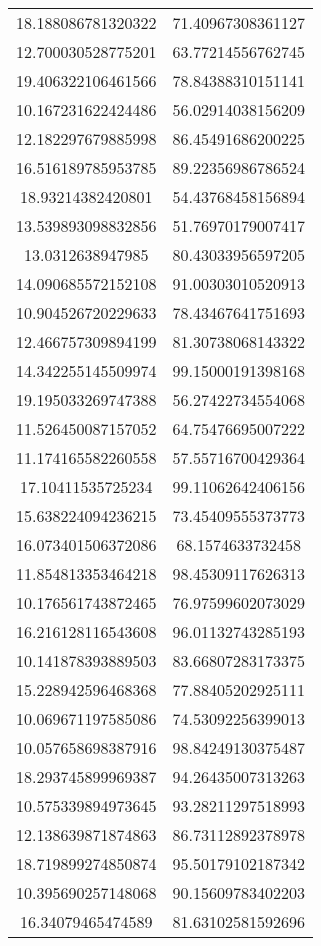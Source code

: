 \begin{table}
\begin{tabular}{cc}
18.188086781320322 & 71.40967308361127 \\
12.700030528775201 & 63.77214556762745 \\
19.406322106461566 & 78.84388310151141 \\
10.167231622424486 & 56.02914038156209 \\
12.182297679885998 & 86.45491686200225 \\
16.516189785953785 & 89.22356986786524 \\
18.93214382420801 & 54.43768458156894 \\
13.539893098832856 & 51.76970179007417 \\
13.0312638947985 & 80.43033956597205 \\
14.090685572152108 & 91.00303010520913 \\
10.904526720229633 & 78.43467641751693 \\
12.466757309894199 & 81.30738068143322 \\
14.342255145509974 & 99.15000191398168 \\
19.195033269747388 & 56.27422734554068 \\
11.526450087157052 & 64.75476695007222 \\
11.174165582260558 & 57.55716700429364 \\
17.10411535725234 & 99.11062642406156 \\
15.638224094236215 & 73.45409555373773 \\
16.073401506372086 & 68.1574633732458 \\
11.854813353464218 & 98.45309117626313 \\
10.176561743872465 & 76.97599602073029 \\
16.216128116543608 & 96.01132743285193 \\
10.141878393889503 & 83.66807283173375 \\
15.228942596468368 & 77.88405202925111 \\
10.069671197585086 & 74.53092256399013 \\
10.057658698387916 & 98.84249130375487 \\
18.293745899969387 & 94.26435007313263 \\
10.575339894973645 & 93.28211297518993 \\
12.138639871874863 & 86.73112892378978 \\
18.719899274850874 & 95.50179102187342 \\
10.395690257148068 & 90.15609783402203 \\
16.34079465474589 & 81.63102581592696 \\

\end{tabular}
\end{table}

